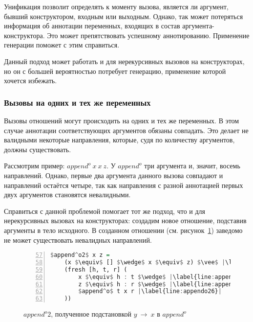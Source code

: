 Унификация позволит определять к моменту вызова, является ли аргумент, бывший конструктором, входным или выходным.
Однако, так может потеряться информация об аннотации переменных, входящих в состав аргумента-конструктора.
Это может препятствовать успешному аннотированию.
Применение генерации поможет с этим справиться. 

Данный подход может работать и для нерекурсивных вызовов на конструкторах, но он с большей вероятностью потребует генерацию, применение которой хочется избежать.


\subsubsection{Вызовы на одних и тех же переменных}

Вызовы отношений могут происходить на одних и тех же переменных.
В этом случае аннотации соответствующих аргументов обязаны совпадать.
Это делает не валидными некоторые направления, которые, судя по количеству аргументов, должны существовать.

Рассмотрим пример: $append^o~x~x~z$.
У $append^o$ три аргумента и, значит, восемь направлений.
Однако, первые два аргумента данного вызова совпадают и направлений остаётся четыре, так как направления с разной аннотацией первых двух аргументов становятся невалидными.

Справиться с данной проблемой помогает тот же подход, что и для нерекурсивных вызовах на конструкторах: создадим новое отношение, подставив аргументы в тело исходного.
В созданном отношении (см. рисунок~\ref{lst:appendo2}) заведомо не может существовать невалидных направлений.
\begin{figure}[h!]
  \begin{center}
  \begin{minipage}{0.4\textwidth}
  \begin{lstlisting}[language=Haskell, frame=single, numbers=left,numberstyle=\small, firstnumber=57, escapechar=|]
  $append^o2$ x z =
    (x $\equiv$ [] $\wedge$ x $\equiv$ z) $\vee$ |\label{line:appendo22}|
    (fresh [h, t, r] (
        x $\equiv$ h : t $\wedge$ |\label{line:appendo24}|
        z $\equiv$ h : r $\wedge$ |\label{line:appendo25}|
        $append^o$ t x r |\label{line:appendo26}|
    ))
    \end{lstlisting}
  \end{minipage}
  \end{center}
  \caption{$append^o2$, полученное подстановкой $y~\rightarrow~x$ в $append^o$}
  \label{lst:appendo2}
\end{figure}
